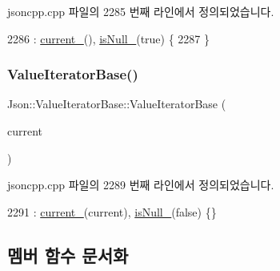 jsoncpp.\+cpp 파일의 2285 번째 라인에서 정의되었습니다.


\begin{DoxyCode}
2286     : \hyperlink{class_json_1_1_value_iterator_base_ab3138ce8af8301cca3b041ea55cb922a}{current\_}(), \hyperlink{class_json_1_1_value_iterator_base_a3e08b114a1aed9bde518c527f94a8c59}{isNull\_}(\textcolor{keyword}{true}) \{
2287 \}
\end{DoxyCode}
\mbox{\label{class_json_1_1_value_iterator_base_a640e990e5f03a96fd650122a2906f59d}} 
\subsubsection{\texorpdfstring{Value\+Iterator\+Base()}{ValueIteratorBase()}\hspace{0.1cm}{\footnotesize\ttfamily [2/2]}}
{\footnotesize\ttfamily Json\+::\+Value\+Iterator\+Base\+::\+Value\+Iterator\+Base (\begin{DoxyParamCaption}\item[{const Value\+::\+Object\+Values\+::iterator \&}]{current }\end{DoxyParamCaption})\hspace{0.3cm}{\ttfamily [explicit]}}



jsoncpp.\+cpp 파일의 2289 번째 라인에서 정의되었습니다.


\begin{DoxyCode}
2291     : \hyperlink{class_json_1_1_value_iterator_base_ab3138ce8af8301cca3b041ea55cb922a}{current\_}(current), \hyperlink{class_json_1_1_value_iterator_base_a3e08b114a1aed9bde518c527f94a8c59}{isNull\_}(\textcolor{keyword}{false}) \{\}
\end{DoxyCode}


\subsection{멤버 함수 문서화}
\mbox{\label{class_json_1_1_value_iterator_base_af11473c9e20d07782e42b52a2f9e4540}} 
